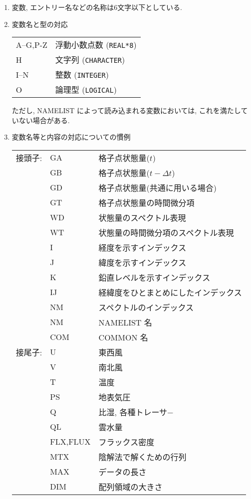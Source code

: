 \begin{enumerate}

\item 変数, エントリー名などの名称は6文字以下としている.

\item 変数名と型の対応 
\begin{center}
\begin{tabular}{ll}
 A--G,P-Z    & 浮動小数点数 ({\tt REAL*8}) \\
 H           & 文字列 ({\tt CHARACTER}) \\
 I--N        & 整数   ({\tt INTEGER}) \\
 O           & 論理型 ({\tt LOGICAL})
\end{tabular}
\end{center}
ただし, NAMELIST によって読み込まれる変数においては, 
これを満たしていない場合がある.

\pagebreak
\item 変数名等と内容の対応についての慣例 
\begin{center} 
\begin{tabular}{lll}
  接頭子: &  GA      & 格子点状態量($t$)         \\
          &  GB      & 格子点状態量($t-\Delta t$) \\
          &  GD      & 格子点状態量(共通に用いる場合) \\   
          &  GT      & 格子点状態量の時間微分項 \\
          &  WD      & 状態量のスペクトル表現 \\
          &  WT      & 状態量の時間微分項のスペクトル表現 \\
          &  I       & 経度を示すインデックス \\
          &  J       & 緯度を示すインデックス \\
          &  K       & 鉛直レベルを示すインデックス \\
          &  IJ      & 経緯度をひとまとめにしたインデックス \\
          &  NM      & スペクトルのインデックス \\
          &  NM      & NAMELIST 名 \\
          &  COM     & COMMON 名 \\
  接尾子: &  U       & 東西風 \\
          &  V       & 南北風 \\
          &  T       & 温度 \\
          &  PS      & 地表気圧 \\
          &  Q       & 比湿, 各種トレーサ− \\
          &  QL      & 雲水量 \\
          & FLX,FLUX & フラックス密度 \\
          & MTX      & 陰解法で解くための行列 \\
          & MAX      & データの長さ \\
          & DIM      & 配列領域の大きさ \\
\end{tabular}
\end{center}


\end{enumerate}
